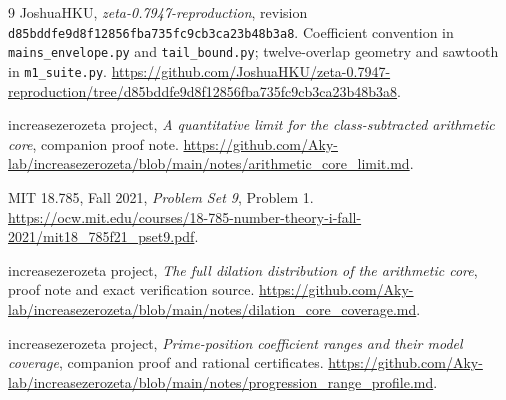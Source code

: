\documentclass[11pt]{article}
\begin{document}
\begin{thebibliography}{9}
JoshuaHKU, \emph{zeta-0.7947-reproduction}, revision
\texttt{d85bddfe9d8f12856fba735fc9cb3ca23b48b3a8}.
Coefficient convention in \texttt{mains\_envelope.py} and
\texttt{tail\_bound.py}; twelve-overlap geometry and sawtooth in
\texttt{m1\_suite.py}.
\url{https://github.com/JoshuaHKU/zeta-0.7947-reproduction/tree/d85bddfe9d8f12856fba735fc9cb3ca23b48b3a8}.

increasezerozeta project, \emph{A quantitative limit for the
class-subtracted arithmetic core}, companion proof note.
\url{https://github.com/Aky-lab/increasezerozeta/blob/main/notes/arithmetic_core_limit.md}.

MIT 18.785, Fall 2021, \emph{Problem Set 9}, Problem 1.
\url{https://ocw.mit.edu/courses/18-785-number-theory-i-fall-2021/mit18_785f21_pset9.pdf}.

increasezerozeta project, \emph{The full dilation distribution of the
arithmetic core}, proof note and exact verification source.
\url{https://github.com/Aky-lab/increasezerozeta/blob/main/notes/dilation_core_coverage.md}.

increasezerozeta project, \emph{Prime-position coefficient ranges and
their model coverage}, companion proof and rational certificates.
\url{https://github.com/Aky-lab/increasezerozeta/blob/main/notes/progression_range_profile.md}.
\end{thebibliography}
\end{document}
